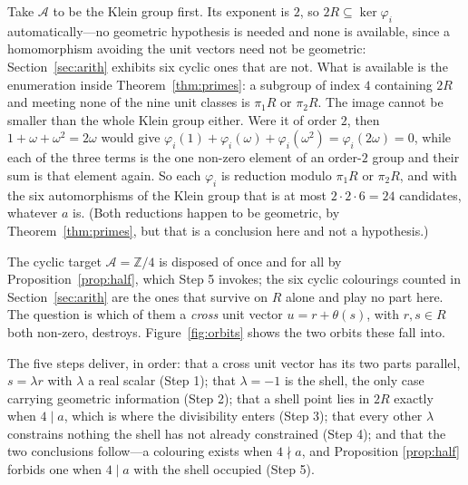 \documentclass[11pt,reqno]{amsart}
\theoremstyle{plain}
\theoremstyle{definition}
\newcommand{\Z}{\mathbb{Z}}
\newcommand{\Lat}{R}
\begin{document}
Take $\mathcal{A}$ to be the Klein group first. Its exponent is $2$, so
$2\Lat \subseteq \ker\varphi_i$ automatically---no geometric hypothesis is needed
and none is available, since a homomorphism avoiding the unit vectors need not be
geometric: Section~\ref{sec:arith} exhibits six cyclic ones that are not. What is
available is the enumeration inside Theorem~\ref{thm:primes}: a subgroup of index
$4$ containing $2\Lat$ and meeting none of the nine unit classes is $\pi_1\Lat$ or
$\pi_2\Lat$. The image cannot be smaller than the whole Klein group either. Were
it of order $2$, then $1 + \omega + \omega^2 = 2\omega$ would give
$\varphi_i(1) + \varphi_i(\omega) + \varphi_i(\omega^2) = \varphi_i(2\omega) = 0$,
while each of the three terms is the one non-zero element of an order-$2$ group
and their sum is that element again. So each $\varphi_i$ is reduction modulo
$\pi_1\Lat$ or $\pi_2\Lat$, and with the six automorphisms of the Klein group that
is at most $2 \cdot 2 \cdot 6 = 24$ candidates, whatever $a$ is. (Both reductions
happen to be geometric, by Theorem~\ref{thm:primes}, but that is a conclusion
here and not a hypothesis.)

The cyclic target $\mathcal{A} = \Z/4$ is disposed of once and for all by
Proposition~\ref{prop:half}, which Step 5 invokes; the six cyclic colourings
counted in Section~\ref{sec:arith} are the ones that survive on $\Lat$ alone and
play no part here. The question is which of
them a \emph{cross} unit vector $u = r + \theta(s)$, with $r,s \in \Lat$ both
non-zero, destroys. Figure~\ref{fig:orbits} shows the two orbits these fall into.

The five steps deliver, in order: that a cross unit vector has its two parts
parallel, $s = \lambda r$ with $\lambda$ a real scalar (Step 1); that
$\lambda = -1$ is the shell, the only case carrying geometric information
(Step 2); that a shell point lies in $2\Lat$ exactly when $4 \mid a$, which is
where the divisibility enters (Step 3); that every other $\lambda$ constrains
nothing the shell has not already constrained (Step 4); and that the two
conclusions follow---a colouring exists when $4 \nmid a$, and Proposition
\ref{prop:half} forbids one when $4 \mid a$ with the shell occupied (Step 5).
\end{document}
